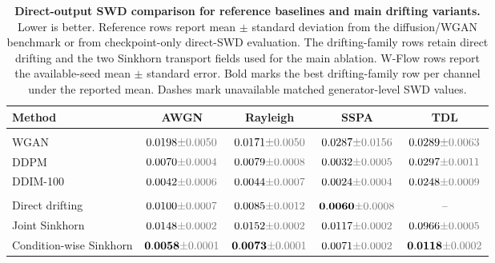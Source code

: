 \begin{table}[t]
\centering
\caption{\textbf{Direct-output SWD comparison for reference baselines and main drifting variants.} Lower is better. Reference rows report mean $\pm$ standard deviation from the diffusion/WGAN benchmark or from checkpoint-only direct-SWD evaluation. The drifting-family rows retain direct drifting and the two Sinkhorn transport fields used for the main ablation. W-Flow rows report the available-seed mean $\pm$ standard error. Bold marks the best drifting-family row per channel under the reported mean. Dashes mark unavailable matched generator-level SWD values.}
\label{tab:wflow-swd-baselines}
\footnotesize
\begin{tabular}{@{}lcccc@{}}
\toprule
Method & AWGN & Rayleigh & SSPA & TDL \\
\midrule
\rowcolor[gray]{0.9} \multicolumn{5}{l}{\textit{Diffusion/WGAN reference baselines}} \\
\headspace WGAN & $0.0198\err{0.0050}$ & $0.0171\err{0.0050}$ & $0.0287\err{0.0156}$ & $0.0289\err{0.0063}$ \\
\headspace DDPM & $0.0070\err{0.0004}$ & $0.0079\err{0.0008}$ & $0.0032\err{0.0005}$ & $0.0297\err{0.0011}$ \\
\headspace DDIM-100 & $0.0042\err{0.0006}$ & $0.0044\err{0.0007}$ & $0.0024\err{0.0004}$ & $0.0248\err{0.0009}$ \\
\midrule
\rowcolor[gray]{0.9} \multicolumn{5}{l}{\textit{Drifting family}} \\
\headspace Direct drifting & $0.0100\err{0.0007}$ & $0.0085\err{0.0012}$ & $\mathbf{0.0060}\err{0.0008}$ & -- \\
\headspace Joint Sinkhorn & $0.0148\err{0.0002}$ & $0.0152\err{0.0002}$ & $0.0117\err{0.0002}$ & $0.0966\err{0.0005}$ \\
\headspace Condition-wise Sinkhorn & $\mathbf{0.0058}\err{0.0001}$ & $\mathbf{0.0073}\err{0.0001}$ & $0.0071\err{0.0002}$ & $\mathbf{0.0118}\err{0.0002}$ \\
\bottomrule
\end{tabular}
\end{table}

